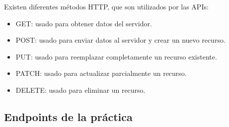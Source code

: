 \documentclass[10pt]{book}
\begin{document}
    Existen diferentes métodos HTTP, que son utilizados por las APIs:
        \begin{itemize}
            \item GET: usado para obtener datos del servidor.
            \item POST: usado para enviar datos al servidor y crear un nuevo recurso.
            \item PUT: usado para reemplazar completamente un recurso existente.
            \item PATCH: usado para actualizar parcialmente un recurso.
            \item DELETE: usado para eliminar un recurso.
        \end{itemize}

    \subsection{Endpoints de la práctica}
\end{document}
